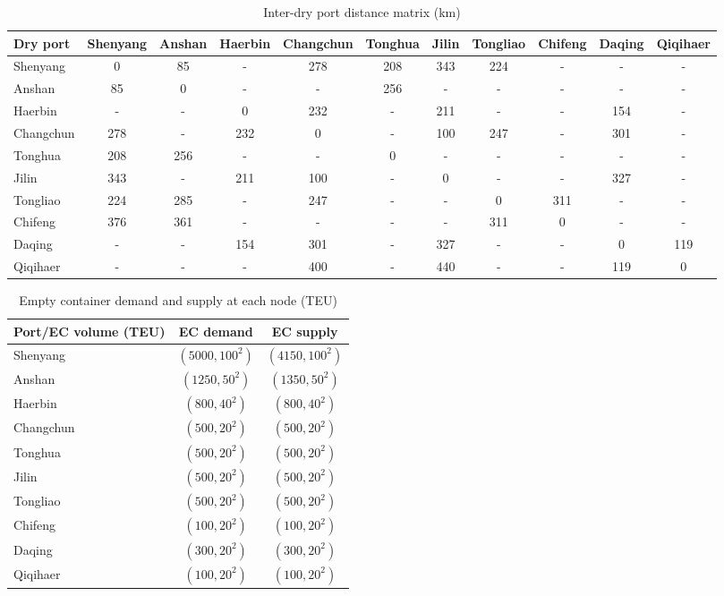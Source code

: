 \documentclass[preprint,12pt]{elsarticle}
\begin{document}
\begin{table}
\centering
\caption{Inter-dry port distance matrix (km)}
\label{tab:inter_dryport_distance}
\small
\setlength{\tabcolsep}{4pt}
\begin{tabular}{l*{10}{c}}
\hline
Dry port & Shenyang & Anshan & Haerbin & Changchun & Tonghua & Jilin & Tongliao & Chifeng & Daqing & Qiqihaer \\
\hline
Shenyang & 0 & 85 & - & 278 & 208 & 343 & 224 & - & - & - \\
Anshan & 85 & 0 & - & - & 256 & - & - & - & - & - \\
Haerbin & - & - & 0 & 232 & - & 211 & - & - & 154 & - \\
Changchun & 278 & - & 232 & 0 & - & 100 & 247 & - & 301 & - \\
Tonghua & 208 & 256 & - & - & 0 & - & - & - & - & - \\
Jilin & 343 & - & 211 & 100 & - & 0 & - & - & 327 & - \\
Tongliao & 224 & 285 & - & 247 & - & - & 0 & 311 & - & - \\
Chifeng & 376 & 361 & - & - & - & - & 311 & 0 & - & - \\
Daqing & - & - & 154 & 301 & - & 327 & - & - & 0 & 119 \\
Qiqihaer & - & - & - & 400 & - & 440 & - & - & 119 & 0 \\
\hline
\end{tabular}
\end{table}

\begin{table}[htbp]
\centering
\caption{Empty container demand and supply at each node (TEU)}
\label{tab:ec_demand_supply}
\begin{tabular}{lcc}
\hline
Port/EC volume (TEU) & EC demand & EC supply \\
\hline
Shenyang & $(5000, 100^2)$ & $(4150, 100^2)$ \\
Anshan & $(1250, 50^2)$ & $(1350, 50^2)$ \\
Haerbin & $(800, 40^2)$ & $(800, 40^2)$ \\
Changchun & $(500, 20^2)$ & $(500, 20^2)$ \\
Tonghua & $(500, 20^2)$ & $(500, 20^2)$ \\
Jilin & $(500, 20^2)$ & $(500, 20^2)$ \\
Tongliao & $(500, 20^2)$ & $(500, 20^2)$ \\
Chifeng & $(100, 20^2)$ & $(100, 20^2)$ \\
Daqing & $(300, 20^2)$ & $(300, 20^2)$ \\
Qiqihaer & $(100, 20^2)$ & $(100, 20^2)$ \\
\hline
\end{tabular}
\end{table}
\clearpage
\end{document}
